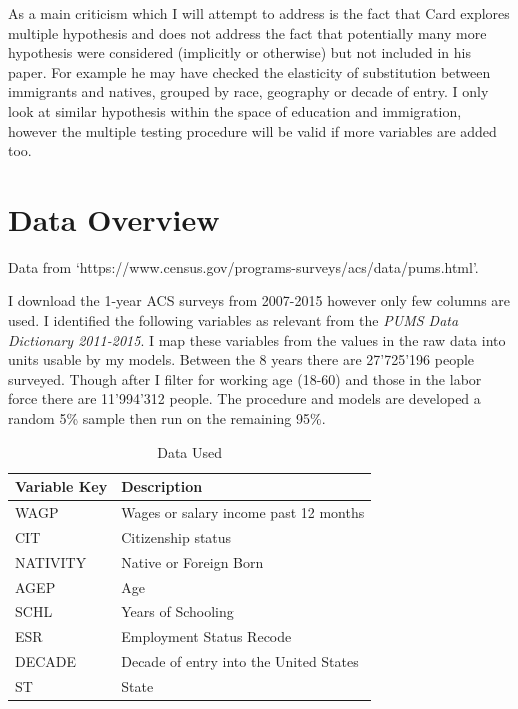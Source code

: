 \documentclass[11pt]{article}
\theoremstyle{definition}
\theoremstyle{remark}
\begin{document}
As a main criticism which I will attempt to address is the fact that Card explores
multiple hypothesis and does not address the fact that potentially many more hypothesis
were considered (implicitly or otherwise) but not included in his paper. For example
he may have checked the elasticity of substitution between immigrants and natives,
grouped by race, geography or decade of entry. I only look at similar hypothesis
within the space of education and immigration, however the multiple testing
procedure will be valid if more variables are added too.

\section{Data Overview}

Data from `https://www.census.gov/programs-surveys/acs/data/pums.html'.

I download the 1-year ACS surveys from 2007-2015 however only few columns
are used. I identified the following variables as relevant from the
\textit{PUMS Data Dictionary 2011-2015}. I map these variables from the
values in the raw data into units usable by my models.
Between the 8 years there are 27'725'196 people surveyed.
Though after I filter for working age (18-60) and those in the labor force
there are 11'994'312 people.
The procedure and models are developed a random 5\% sample then run
on the remaining 95\%.


\begin{table}[H]
    \caption{Data Used }
    \vspace{5mm}
    \label{}
    \centering
    \begin{tabular}{| l | l |}
        \hline
        Variable Key    & Description \\
        \hline \hline

        WAGP            & Wages or salary income past 12 months \\
        CIT             & Citizenship status \\
        NATIVITY        & Native or Foreign Born \\
        AGEP            & Age \\
        SCHL            & Years of Schooling \\
        ESR             & Employment Status Recode \\
        DECADE          & Decade of entry into the United States \\
        ST              & State \\
        \hline
    \end{tabular}
\end{table}
\end{document}
